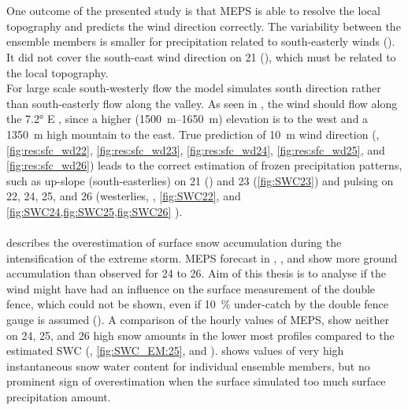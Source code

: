 \\
\\
One outcome of the presented study is that MEPS is able to resolve the local topography and predicts the wind direction correctly. The variability between the ensemble members is smaller for precipitation related to south-easterly winds (). It did not cover the south-east wind direction on \SI{21}{\dec} (), which must be related to the local topography. 
\\
For 
large scale south-westerly flow the model simulates south direction rather than 
south-easterly flow along the valley. As seen in , the wind should flow along the \ang{7.2} E%
, since a higher (\SIrange{1500}{1650}{\metre}) elevation is to the west and a \SI{1350}{\metre} high mountain to the east. True prediction of \SI{10}{\metre} wind direction (, \ref{fig:res:sfc_wd22}, \ref{fig:res:sfc_wd23}, \ref{fig:res:sfc_wd24}, \ref{fig:res:sfc_wd25}, and \ref{fig:res:sfc_wd26}) leads to the correct estimation of frozen precipitation patterns, such as up-slope (south-easterlies) on \num{21} () and \SI{23}{\dec} (\ref{fig:SWC23}) and pulsing on \num{22}, \num{24}, \num{25}, and \SI{26}{\dec} (westerlies, , \ref{fig:SWC22}, and \ref{fig:SWC24,fig:SWC25,fig:SWC26} ). 
\\
\\
 describes the overestimation of surface snow accumulation during the intensification of the extreme storm. MEPS forecast in , , and  show more ground accumulation than observed for \num{24} to \SI{26}{\dec}. Aim of this thesis is to analyse if the wind might have had an influence on the surface measurement of the double fence, which could not be shown, even if \SI{10}{\percent} under-catch by the double fence gauge is assumed (). A comparison of the hourly values of MEPS, show neither on \num{24}, \num{25}, and \SI{26}{\dec} high snow amounts in the lower most profiles compared to the estimated SWC (, \ref{fig:SWC_EM:25}, and ).  shows values of very high instantaneous snow water content for individual ensemble members, but no prominent sign of overestimation when the surface %
simulated too much surface precipitation amount.
